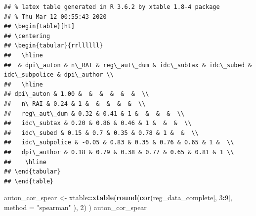 \documentclass[
]{article}
\newenvironment{Shaded}{\begin{snugshade}}{\end{snugshade}}
\newcommand{\DataTypeTok}[1]{\textcolor[rgb]{0.13,0.29,0.53}{#1}}
\newcommand{\DecValTok}[1]{\textcolor[rgb]{0.00,0.00,0.81}{#1}}
\newcommand{\KeywordTok}[1]{\textcolor[rgb]{0.13,0.29,0.53}{\textbf{#1}}}
\newcommand{\NormalTok}[1]{#1}
\newcommand{\OperatorTok}[1]{\textcolor[rgb]{0.81,0.36,0.00}{\textbf{#1}}}
\newcommand{\StringTok}[1]{\textcolor[rgb]{0.31,0.60,0.02}{#1}}
\begin{document}
\begin{verbatim}
## % latex table generated in R 3.6.2 by xtable 1.8-4 package
## % Thu Mar 12 00:55:43 2020
## \begin{table}[ht]
## \centering
## \begin{tabular}{rrllllll}
##   \hline
##  & dpi\_auton & n\_RAI & reg\_aut\_dum & idc\_subtax & idc\_subed & idc\_subpolice & dpi\_author \\ 
##   \hline
## dpi\_auton & 1.00 &  &  &  &  &  &  \\ 
##   n\_RAI & 0.24 & 1 &  &  &  &  &  \\ 
##   reg\_aut\_dum & 0.32 & 0.41 & 1 &  &  &  &  \\ 
##   idc\_subtax & 0.20 & 0.86 & 0.46 & 1 &  &  &  \\ 
##   idc\_subed & 0.15 & 0.7 & 0.35 & 0.78 & 1 &  &  \\ 
##   idc\_subpolice & -0.05 & 0.83 & 0.35 & 0.76 & 0.65 & 1 &  \\ 
##   dpi\_author & 0.18 & 0.79 & 0.38 & 0.77 & 0.65 & 0.81 & 1 \\ 
##    \hline
## \end{tabular}
## \end{table}
\end{verbatim}

\begin{Shaded}
\begin{Highlighting}[]
\NormalTok{auton_cor_spear <-}\StringTok{ }\NormalTok{xtable}\OperatorTok{::}\KeywordTok{xtable}\NormalTok{(}\KeywordTok{round}\NormalTok{(}\KeywordTok{cor}\NormalTok{(reg_data_complete[, }\DecValTok{3}\OperatorTok{:}\DecValTok{9}\NormalTok{], }
                                            \DataTypeTok{method =} \StringTok{"spearman"}
\NormalTok{                                            ), }\DecValTok{2}\NormalTok{)}
\NormalTok{                                  )}
\NormalTok{auton_cor_spear}
\end{Highlighting}
\end{Shaded}
\end{document}
